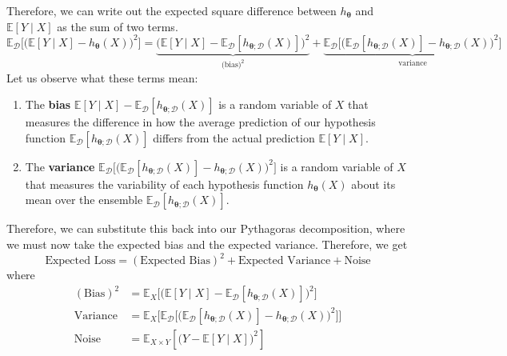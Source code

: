 \documentclass{article}
\begin{document}
      \begin{theorem}
        Therefore, we can write out the expected square difference between $h_{\boldsymbol{\theta}}$ and $\mathbb{E}[Y\mid X]$ as the sum of two terms. 
        \begin{equation}
          \mathbb{E}_\mathcal{D} \big[ \big(\mathbb{E}[Y \mid X] - h_{\boldsymbol{\theta}}(X) \big)^2 \big] = \underbrace{\big( \mathbb{E}[Y \mid X] - \mathbb{E}_\mathcal{D} [h_{{\boldsymbol{\theta}}; \mathcal{D}} (X)] \big)^2}_{\text{(bias)}^2} + \underbrace{ \mathbb{E}_\mathcal{D} \big[ \big( \mathbb{E}_\mathcal{D} [h_{{\boldsymbol{\theta}}; \mathcal{D}} (X)] - h_{\boldsymbol{\theta}; \mathcal{D}}(X) \big)^2 \big]}_{\text{variance}}
        \end{equation}
        Let us observe what these terms mean: 
        \begin{enumerate}
          \item The \textbf{bias} $\mathbb{E}[Y \mid X] - \mathbb{E}_\mathcal{D} [h_{{\boldsymbol{\theta}}; \mathcal{D}} (X)]$ is a random variable of $X$ that measures the difference in how the average prediction of our hypothesis function $\mathbb{E}_\mathcal{D} [h_{{\boldsymbol{\theta}}; \mathcal{D}} (X)]$ differs from the actual prediction $\mathbb{E}[Y \mid X]$. 

          \item The \textbf{variance} $\mathbb{E}_\mathcal{D} \big[ \big( \mathbb{E}_\mathcal{D} [h_{{\boldsymbol{\theta}}; \mathcal{D}} (X)] - h_{{\boldsymbol{\theta}}; \mathcal{D}} (X) \big)^2 \big]$ is a random variable of $X$ that measures the variability of each hypothesis function $h_{\boldsymbol{\theta}}(X)$ about its mean over the ensemble $\mathbb{E}_\mathcal{D} [h_{{\boldsymbol{\theta}}; \mathcal{D}} (X)]$. 
        \end{enumerate}
      \end{theorem}

      Therefore, we can substitute this back into our Pythagoras decomposition, where we must now take the expected bias and the expected variance. Therefore, we get 
      \begin{equation}
        \text{Expected Loss} = (\text{Expected Bias})^2 + \text{Expected Variance} + \text{Noise}
      \end{equation}
      where 
      \begin{align*}
        (\text{Bias})^2 & = \mathbb{E}_X \big[ \big( \mathbb{E}[Y \mid X] - \mathbb{E}_\mathcal{D} [h_{{\boldsymbol{\theta}}; \mathcal{D}} (X)] \big)^2 \big] \\
        \text{Variance} & = \mathbb{E}_X \big[ \mathbb{E}_\mathcal{D} \big[ \big( \mathbb{E}_\mathcal{D} [h_{{\boldsymbol{\theta}}; \mathcal{D}} (X)] - h_{\boldsymbol{\theta}; \mathcal{D}}(X) \big)^2 \big] \big] \\
        \text{Noise} & = \mathbb{E}_{X \times Y}[\big(Y - \mathbb{E}[Y \mid X]\big)^2]
      \end{align*}
\end{document}
